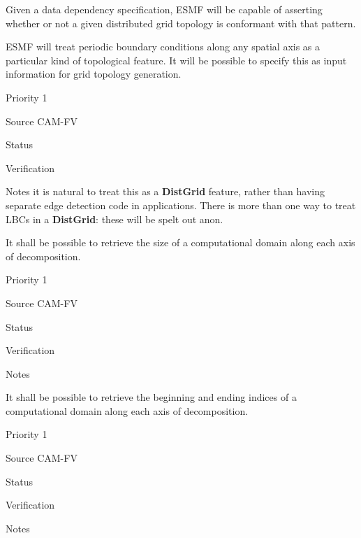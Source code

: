 Given a data dependency specification, ESMF will be capable of
asserting whether or not a given distributed grid topology is
conformant with that pattern.


ESMF will treat periodic boundary conditions along any spatial axis as
a particular kind of topological feature. It will be possible to
specify this as input information for grid topology generation.

\begin{reqlist}
\item[Priority] 1
\item[Source] CAM-FV
\item[Status]
\item[Verification]
\item[Notes] it is natural to treat this as a \textbf{DistGrid}
  feature, rather than having separate edge detection code in
  applications. There is more than one way to treat LBCs in a
  \textbf{DistGrid}: these will be spelt out anon.
\end{reqlist}




It shall be possible to retrieve the size of a computational domain
along each axis of decomposition.

\begin{reqlist}
\item[Priority] 1
\item[Source] CAM-FV
\item[Status]
\item[Verification]
\item[Notes]
\end{reqlist}


It shall be possible to retrieve the beginning and ending indices of a
computational domain along each axis of decomposition.

\begin{reqlist}
\item[Priority] 1
\item[Source] CAM-FV
\item[Status]
\item[Verification]
\item[Notes]
\end{reqlist}

